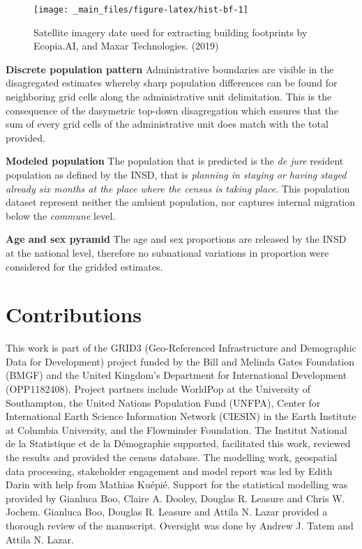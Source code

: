 \documentclass[]{book}
\begin{document}
\begin{figure}

{\centering \texttt{[image: \_main\_files/figure-latex/hist-bf-1]} 

}

\caption{Satellite imagery date used for extracting building footprints by Ecopia.AI, and Maxar Technologies. (2019)}\label{fig:hist-bf}
\end{figure}

\textbf{Discrete population pattern} Administrative boundaries are
visible in the disagregated estimates whereby sharp population
differences can be found for neighboring grid cells along the
administrative unit delimitation. This is the consequence of the
dasymetric top-down disagregation which ensures that the sum of every
grid cells of the administrative unit does match with the total
provided.

\textbf{Modeled population} The population that is predicted is the
\emph{de jure} resident population as defined by the INSD, that is
\emph{planning in staying or having stayed already six months at the
place where the census is taking place}. This population dataset
represent neither the ambient population, nor captures internal
migration below the \emph{commune} level.

\textbf{Age and sex pyramid} The age and sex proportions are released by
the INSD at the national level, therefore no subnational variations in
proportion were considered for the gridded estimates.

\section*{Contributions}\label{contributions}

This work is part of the GRID3 (Geo-Referenced Infrastructure and
Demographic Data for Development) project funded by the Bill and Melinda
Gates Foundation (BMGF) and the United Kingdom's Department for
International Development (OPP1182408). Project partners include
WorldPop at the University of Southampton, the United Nations Population
Fund (UNFPA), Center for International Earth Science Information Network
(CIESIN) in the Earth Institute at Columbia University, and the
Flowminder Foundation. The Institut National de la Statistique et de la
Démographie supported, facilitated this work, reviewed the results and
provided the census database. The modelling work, geospatial data
processing, stakeholder engagement and model report was led by Edith
Darin with help from Mathias Kuépié. Support for the statistical
modelling was provided by Gianluca Boo, Claire A. Dooley, Douglas R.
Leasure and Chris W. Jochem. Gianluca Boo, Douglas R. Leasure and Attila
N. Lazar provided a thorough review of the manuscript. Oversight was
done by Andrew J. Tatem and Attila N. Lazar.
\end{document}

